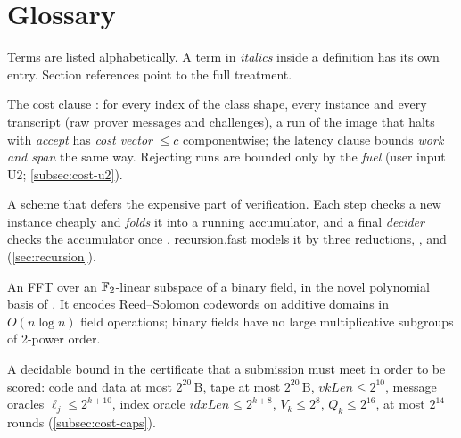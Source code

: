 \section{Glossary}\label{sec:glossary}

Terms are listed alphabetically. A term in \emph{italics} inside a definition has its own entry.
Section references point to the full treatment.

\begingroup\small
\begin{description}[leftmargin=0pt,itemsep=2pt,parsep=0pt,font=\normalfont\bfseries]

\item[Accepting-run bound.] The cost clause : for every index of the
  class shape, every instance and every transcript (raw prover messages and challenges), a run of
  the image that halts with \emph{accept} has \emph{cost vector} $\le c$ componentwise; the latency
  clause  bounds \emph{work and span} the same way. Rejecting runs are
  bounded only by the \emph{fuel} (user input U2; \cref{subsec:cost-u2}).

\item[Accumulation scheme.] A scheme that defers the expensive part of verification. Each step
  checks a new instance cheaply and \emph{folds} it into a running accumulator, and a final
  \emph{decider} checks the accumulator once \cite{BCMS20,BCLMS21}. recursion.fast models it by
  three reductions, ,  and  (\cref{sec:recursion}).

\item[Additive FFT.] An FFT over an $\mathbb{F}_2$-linear subspace of a binary field, in the novel
  polynomial basis of \cite{LCH14-AdditiveFFT}. It encodes Reed--Solomon codewords on additive
  domains in $O(n\log n)$ field operations; binary fields have no large multiplicative subgroups
  of 2-power order.

\item[Admission cap.] A decidable bound in the certificate that a submission must meet in order to be
  scored: code and data at most $2^{20}$\,B, tape at most $2^{20}$\,B, $\mathit{vkLen}\le2^{10}$,
  message oracles $\ell_j\le2^{k+10}$, index oracle $\mathit{idxLen}\le2^{k+8}$, $V_k\le2^8$,
  $Q_k\le2^{16}$, at most $2^{14}$ rounds (\cref{subsec:cost-caps}).


\end{description}
